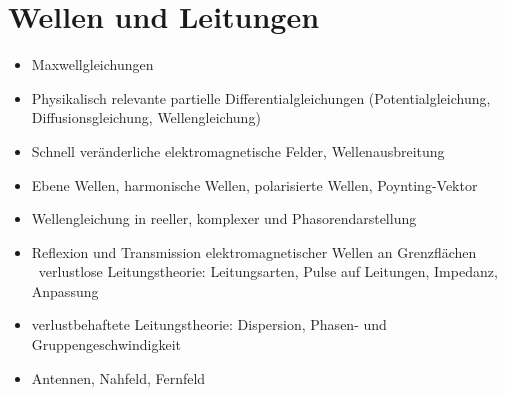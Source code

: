 \documentclass[german]{latex4ei/latex4ei_sheet}
\begin{document}
\section{Wellen und Leitungen}
\begin{sectionbox}
\begin{itemize}
    \item Maxwellgleichungen
    \item Physikalisch relevante partielle Differentialgleichungen (Potentialgleichung,
        Diffusionsgleichung, Wellengleichung)
    \item Schnell veränderliche elektromagnetische Felder, Wellenausbreitung
    \item Ebene Wellen, harmonische Wellen, polarisierte Wellen, Poynting-Vektor
    \item Wellengleichung in reeller, komplexer und Phasorendarstellung
    \item Reflexion und Transmission elektromagnetischer Wellen an Grenzflächen
    \ verlustlose Leitungstheorie: Leitungsarten, Pulse auf Leitungen, Impedanz, Anpassung
    \item verlustbehaftete Leitungstheorie: Dispersion, Phasen- und Gruppengeschwindigkeit
    \item Antennen, Nahfeld, Fernfeld
\end{itemize}

\end{sectionbox}
\end{document}
